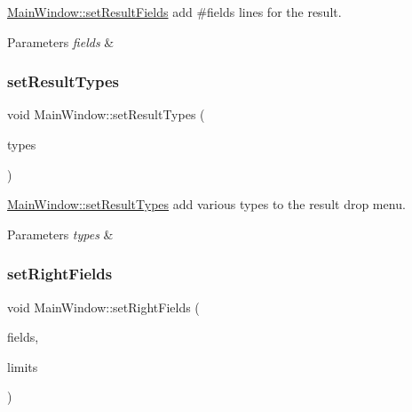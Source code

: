 \hyperlink{class_main_window_ae00d4afec436d34430e43dcc6742b875}{Main\+Window\+::set\+Result\+Fields} add \#fields lines for the result. 


\begin{DoxyParams}{Parameters}
{\em fields} & \\
\hline
\end{DoxyParams}
\mbox{\label{class_main_window_a5e2ad194f3764cb9a321b01193c53be9}} 
\subsubsection{\texorpdfstring{set\+Result\+Types}{setResultTypes}}
{\footnotesize\ttfamily void Main\+Window\+::set\+Result\+Types (\begin{DoxyParamCaption}\item[{const Q\+Vector$<$ Q\+String $>$}]{types }\end{DoxyParamCaption})\hspace{0.3cm}{\ttfamily [slot]}}



\hyperlink{class_main_window_a5e2ad194f3764cb9a321b01193c53be9}{Main\+Window\+::set\+Result\+Types} add various types to the result drop menu. 


\begin{DoxyParams}{Parameters}
{\em types} & \\
\hline
\end{DoxyParams}
\mbox{\label{class_main_window_a8cbaa03b855c6ab3bb7a910662346549}} 
\subsubsection{\texorpdfstring{set\+Right\+Fields}{setRightFields}}
{\footnotesize\ttfamily void Main\+Window\+::set\+Right\+Fields (\begin{DoxyParamCaption}\item[{const int \&}]{fields,  }\item[{const Q\+Vector$<$ Q\+String $>$ \&}]{limits }\end{DoxyParamCaption})\hspace{0.3cm}{\ttfamily [slot]}}



